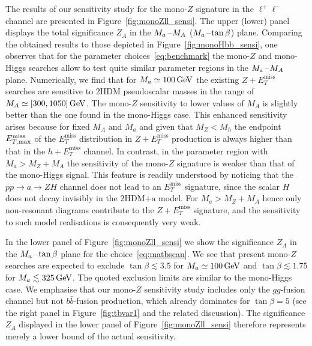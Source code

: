 \documentclass[a4paper, 11pt,notoc]{article}
\newcommand{\MET}{\ensuremath{E_T^\mathrm{miss}}\xspace}
\newcommand{\mA}{\ensuremath{M_{A}}\xspace}
\newcommand{\ma}{\ensuremath{M_{a}}\xspace}
\newcommand{\hdma}{\ensuremath{\textrm{2HDM+a}}\xspace}
\begin{document}
The results of our sensitivity study for the mono-$Z$ signature in the $\ell^+ \ell^-$ channel are presented in Figure~\ref{fig:monoZll_sensi}. The upper (lower) panel displays the total significance $Z_A$  in the $\ma\hspace{0.25mm}$--$\hspace{0.25mm}\mA$ ($\ma\hspace{0.25mm}$--$\hspace{0.25mm}\tan \beta$) plane. Comparing the obtained results to those depicted in Figure~\ref{fig:monoHbb_sensi}, one observes that for the parameter choices~\eqref{eq:benchmark} the mono-$Z$ and mono-Higgs searches allow to test quite similar parameter regions in the $\ma\hspace{0.25mm}$--$\hspace{0.25mm}\mA$ plane. Numerically, we find  that for $\ma \simeq 100 \, {\rm GeV}$  the existing $Z + \MET$ searches are sensitive to 2HDM pseudoscalar masses  in the range of $\mA \simeq [300, 1050] \, {\rm GeV}$. The mono-$Z$ sensitivity to lower values of $M_A$ is slightly better than the one found in the mono-Higgs case. This enhanced sensitivity arises because for fixed $M_A$ and $M_a$ and given that $M_Z < M_h$ the endpoint $E_{T, \rm max}^{\rm miss}$ of the $\MET$ distribution in $Z+ \MET$ production is always higher  than that in  the $h+ \MET$ channel. In contrast, in the parameter region with $M_a > M_Z + M_A$ the sensitivity of the mono-$Z$ signature is weaker than that of the mono-Higgs  signal. This feature is readily understood by noticing that the $pp \to a \to Z H$ channel does not lead to an $\MET$ signature, since the scalar $H$ does not decay invisibly in the \hdma model. For $M_a > M_Z + M_A$ hence only non-resonant diagrams contribute to the $Z+\MET$ signature, and the sensitivity to such model realisations is consequently very weak. 

 In the lower panel of Figure~\ref{fig:monoZll_sensi} we show the significance $Z_A$ in the $\ma\hspace{0.25mm}$--$\hspace{0.25mm}\tan \beta$ plane for the choice~\eqref{eq:matbscan}.   We see that present mono-$Z$ searches are expected to exclude $\tan \beta \lesssim 3.5$ for $M_a \simeq 100 \, {\rm GeV}$ and $\tan \beta \lesssim 1.75$ for $M_a \lesssim 325 \, {\rm GeV}$. The quoted exclusion limits are similar to  the mono-Higgs case. We emphasise that our mono-$Z$ sensitivity study includes only the $gg$-fusion channel but not $b \bar b$-fusion production, which already dominates for  $\tan \beta = 5$ (see the right  panel in Figure~\ref{fig:tbvar1} and the related discussion). The significance $Z_A$ displayed  in the lower panel of Figure~\ref{fig:monoZll_sensi}  therefore represents  merely a lower bound of the actual sensitivity.
\end{document}
